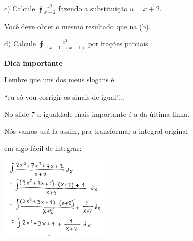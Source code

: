 \documentclass[oneside,12pt]{article}
\begin{document}
\ssk

c) Calcule $\intx{\frac{x^3}{x+2}}$ fazendo a substituição $u=x+2$.

Você deve obter o mesmo resultado que na (b).

\bsk

d) Calcule $\intx{\frac{x^2}{(x+1)(x-1)}}$ por frações parciais.


\newpage

{\bf Dica importante}

\ssk

Lembre que uns dos meus slogans é

``eu só vou corrigir os sinais de igual''...

No slide 7 a igualdade mais importante é a da última linha.

Nós vamos usá-la assim, pra transformar a integral original

em algo fácil de integrar:

\msk

\includegraphics[height=4cm]{2020-1-C2/20201119_C2_div_com_resto_4.pdf}
\end{document}
